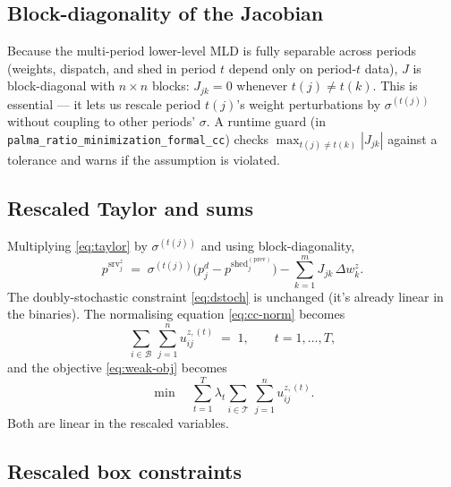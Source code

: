 \documentclass[11pt]{article}
\newcommand{\pshed}{p^{\mathrm{shed}}}
\newcommand{\pserved}{p^{\mathrm{srv}}}
\newcommand{\pprev}{\pshed^{(\mathrm{prev})}}
\newcommand{\Top}{\mathcal{T}}
\newcommand{\Bot}{\mathcal{B}}
\begin{document}
\subsection{Block-diagonality of the Jacobian}

Because the multi-period lower-level MLD is fully separable across periods
(weights, dispatch, and shed in period $t$ depend only on period-$t$ data),
$J$ is block-diagonal with $n\times n$ blocks: $J_{jk} = 0$ whenever
$t(j) \ne t(k)$. This is essential — it lets us rescale period $t(j)$'s
weight perturbations by $\sigma^{(t(j))}$ without coupling to other periods'
$\sigma$. A runtime guard (in \texttt{palma\_ratio\_minimization\_formal\_cc})
checks $\max_{t(j)\ne t(k)} |J_{jk}|$ against a tolerance and warns if the
assumption is violated.

\subsection{Rescaled Taylor and sums}

Multiplying \eqref{eq:taylor} by $\sigma^{(t(j))}$ and using block-diagonality,
\begin{equation}\label{eq:taylor-z}
    \pserved^{z}_{j}
    \;=\; \sigma^{(t(j))}\bigl(p^{d}_{j} - \pprev_{j}\bigr)
        - \sum_{k=1}^{m} J_{jk}\,\Delta w^{z}_{k}.
\end{equation}
The doubly-stochastic constraint \eqref{eq:dstoch} is unchanged (it's already
linear in the binaries). The normalising equation \eqref{eq:cc-norm} becomes
\begin{equation}\label{eq:cc-norm-z}
    \sum_{i\in\Bot}\,\sum_{j=1}^{n} u^{z,(t)}_{ij} \;=\; 1, \qquad t = 1,\dots,T,
\end{equation}
and the objective \eqref{eq:weak-obj} becomes
\begin{equation}\label{eq:formal-obj}
    \min \quad
    \sum_{t=1}^{T} \lambda_{t} \sum_{i\in\Top}\,\sum_{j=1}^{n} u^{z,(t)}_{ij}.
\end{equation}
Both are linear in the rescaled variables.

\subsection{Rescaled box constraints}
\end{document}
